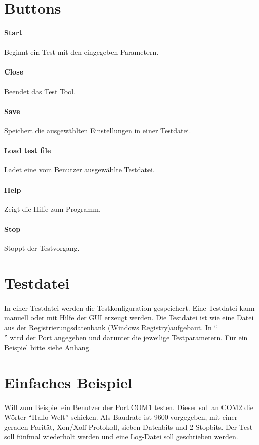\section{Buttons}
\paragraph{Start} Beginnt ein Test mit den eingegeben Parametern.
\paragraph{Close} Beendet das Test Tool.
\paragraph{Save} Speichert die ausgewählten Einstellungen in einer Testdatei.
\paragraph{Load test file} Ladet eine vom Benutzer ausgewählte Testdatei.
\paragraph{Help} Zeigt die Hilfe zum Programm.
\paragraph{Stop} Stoppt der Testvorgang.



\section{Testdatei}
\paragraph{}
In einer Testdatei werden die Testkonfiguration gespeichert. Eine Testdatei kann manuell oder mit Hilfe der GUI erzeugt werden. Die Testdatei ist wie eine Datei aus der Registrierungsdatenbank (Windows Registry)aufgebaut. In "`\[\]"' wird der Port angegeben und darunter die jeweilige Testparametern. Für ein Beispiel bitte siehe Anhang. 

\section{Einfaches Beispiel}
\paragraph{}
Will zum Beispiel ein Benutzer der Port COM1 testen. Dieser soll an COM2 die Wörter "`Hallo Welt"' schicken. Als Baudrate ist 9600 vorgegeben, mit einer geraden Parität, Xon/Xoff Protokoll, sieben Datenbits und 2 Stopbits. Der Test soll fünfmal wiederholt werden und eine Log-Datei soll geschrieben werden.

